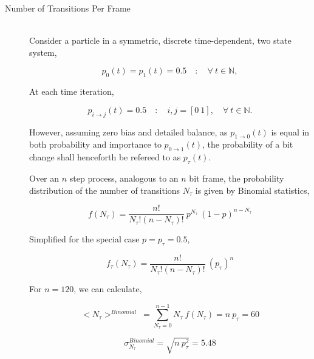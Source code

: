 			\begin{description}
				\item[Number of Transitions Per Frame] \hfill \\
					
					Consider a particle in a symmetric, discrete time-dependent, two state system,

					\begin{equation}
						p_0(t) = p_1(t) = 0.5 \quad : \quad \forall\ t \in \mathbb{N},
					\end{equation}

					At each time iteration,

					\begin{equation}
						p_{i \to j}(t) = 0.5 \quad : \quad i,j = [0\ 1], \quad \forall\ t \in \mathbb{N}.
					\end{equation}

					However, assuming zero bias and detailed balance, as $p_{1 \to 0}(t)$ is equal in both probability and importance to $p_{0 \to 1}(t)$, the probability of a bit change shall henceforth be refereed to as $p_{\tau}(t)$.
					\par
					Over an $n$ step process, analogous to an $n$ bit frame, the probability distribution of the number of transitions $N_\tau$ is given by Binomial statistics,

					\begin{equation}
						f(N_{\tau}) = \frac{n!}{N_{\tau}!(n-N_{\tau})!}\ p^{N_{\tau}}\ (1 - p)^{n-N_{\tau}}
					\end{equation}

					Simplified for the special case $p = p_{\tau} = 0.5$,

					\begin{equation}
						f_{\tau}(N_{\tau}) = \frac{n!}{N_{\tau}!(n-N_{\tau})!}\ (p_{\tau})^{n}
						\label{eqn:transition_propability_dencity}
					\end{equation}

					For $n = 120$, we can calculate,

					\begin{equation}
						<N_\tau>^{Binomial} \ = \sum_{N_{\tau}=0}^{n-1} N_{\tau}\ f(N_{\tau}) = n\ p_{\tau} = 60
						\label{eqn:tansition_expectation}
					\end{equation}

					\begin{equation}
						\sigma_{N_\tau}^{Binomial} = \sqrt{ n\ p_{\tau}^2} = 5.48
					\end{equation}


\end{description}
